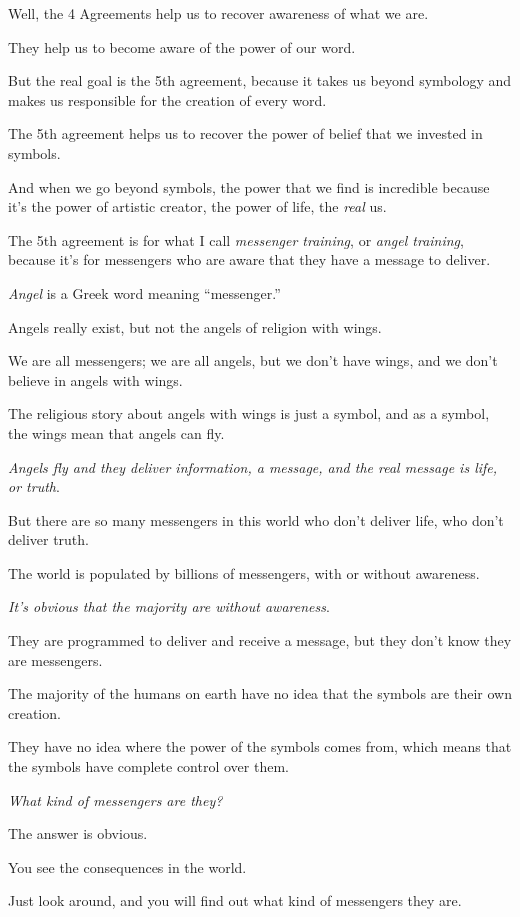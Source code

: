 \documentclass{article}
\numberwithin{equation}{section}
\begin{document}
Well, the 4 Agreements help us to recover awareness of what we are.

They help us to become aware of the power of our word.

But the real goal is the 5th agreement, because it takes us beyond symbology and makes us responsible for the creation of every word.

The 5th agreement helps us to recover the power of belief that we invested in symbols.

And when we go beyond symbols, the power that we find is incredible because it's the power of artistic creator, the power of life, the \textit{real} us.

%
The 5th agreement is for what I call \textit{messenger training}, or \textit{angel training}, because it's for messengers who are aware that they have a message to deliver.

\textit{Angel} is a Greek word meaning ``messenger.''

Angels really exist, but not the angels of religion with wings.

We are all messengers; we are all angels, but we don't have wings, and we don't believe in angels with wings.

The religious story about angels with wings is just a symbol, and as a symbol, the wings mean that angels can fly.

%
\textit{Angels fly and they deliver information, a message, and the real message is life, or truth}.

But there are so many messengers in this world who don't deliver life, who don't deliver truth.

The world is populated by billions of messengers, with or without awareness.

\textit{It's obvious that the majority are without awareness}.

They are programmed to deliver and receive a message, but they don't know they are messengers.

The majority of the humans on earth have no idea that the symbols are their own creation.

They have no idea where the power of the symbols comes from, which means that the symbols have complete control over them.

%
\textit{What kind of messengers are they?}

The answer is obvious.

You see the consequences in the world.

Just look around, and you will find out what kind of messengers they are.
\end{document}
